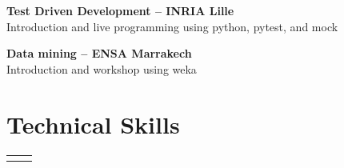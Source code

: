 \documentclass[10pt]{article} %
\begin{document}
\begin{paracol}{2}

\textbf{Test Driven Development -- INRIA Lille }\\{Introduction and live programming using python, pytest, and mock}

\textbf{Data mining -- ENSA Marrakech}\\{Introduction and workshop using weka}


\section{Technical Skills} 





\begin{supertabular}{rl} %
	
	


	
	
\end{supertabular}




\end{paracol}
\end{document}
